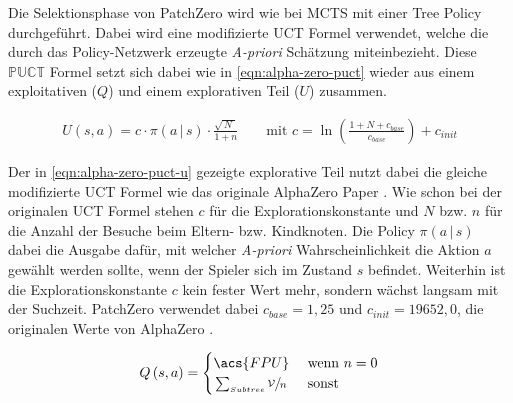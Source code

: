 Die Selektionsphase von PatchZero wird wie bei \ac{MCTS} mit einer Tree Policy durchgeführt. Dabei wird eine modifizierte \ac{UCT} Formel verwendet, welche die durch das Policy-Netzwerk erzeugte \emph{A-priori} Schätzung miteinbezieht. Diese $\mathbb{PUCT}$ Formel setzt sich dabei wie in \ref{eqn:alpha-zero-puct} wieder aus einem exploitativen ($Q$) und einem explorativen Teil ($U$) zusammen.

\begin{align}
    \label{eqn:alpha-zero-puct-q}
    U\left(s,a\right) = c \cdot \pi\left(a\,|\,s\right) \cdot \frac{\sqrt{\,N\,\,}}{1 + n}\qquad \text{mit } c=\ln\left(\frac{1 + N + c_{base}}{c_{base}}\right) + c_{init}
\end{align}

Der in \ref{eqn:alpha-zero-puct-u} gezeigte explorative Teil nutzt dabei die gleiche modifizierte \ac{UCT} Formel wie das originale AlphaZero Paper \cite[Anhang, S. 2]{2017.AlphaGoZeroPaper}. Wie schon bei der originalen \ac{UCT} Formel stehen $c$ für die Explorationskonstante und $N$ bzw. $n$ für die Anzahl der Besuche beim Eltern- bzw. Kindknoten. Die Policy $\pi\left(a\,|\,s\right)$ dabei die Ausgabe dafür, mit welcher \emph{A-priori} Wahrscheinlichkeit die Aktion $a$ gewählt werden sollte, wenn der Spieler sich im Zustand $s$ befindet. Weiterhin ist die Explorationskonstante $c$ kein fester Wert mehr, sondern wächst langsam mit der Suchzeit. PatchZero verwendet dabei $c_{base} = 1{,}25$ und $c_{init} = 19652{,}0$, die originalen Werte von AlphaZero \cite[S. 17]{2018.AlphaZero}.

\begin{align}
    \label{eqn:alpha-zero-puct-u}
    Q\left(s,a\right) = \begin{cases}
        \acs{FPU}         & \text{ wenn } n = 0 \\
        \sfrac{\sum_{Subtree} \mathcal{V}}{n} & \text{ sonst }
    \end{cases}
\end{align}

